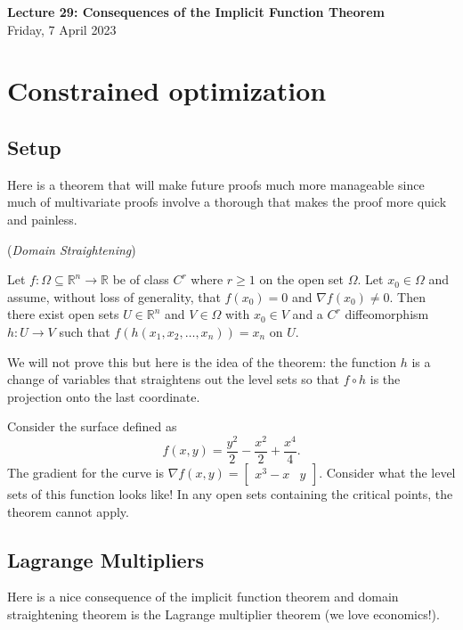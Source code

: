 \documentclass[11pt]{article}
\theoremstyle{definition}
\newcommand{\R}{\mathbb{R}}                      %
\newcommand{\mat}{\begin{bmatrix}}
\newcommand{\trix}{\end{bmatrix}}
\begin{document}
\thispagestyle{empty}

\begin{center}
{\LARGE \bf Lecture 29: Consequences of the Implicit Function Theorem}\\
{\large Friday, 7 April 2023}\\
\end{center}

\section{Constrained optimization}

\subsection{Setup}
Here is a theorem that will make future proofs much more manageable since much of multivariate proofs involve a thorough  that makes the proof more quick and painless. 

\begin{shaded}
\theorem (\textit{Domain Straightening})

Let $f:\Omega\subseteq \R^n\to \R$ be of class $C^r$ where $r\geq 1$ on the open set $\Omega$. Let $x_0\in\Omega$ and assume, without loss of generality, that $f(x_0)=0$ and $\nabla f(x_0)\neq 0$. Then there exist open sets $U\in\R^n$ and $V\in\Omega$ with $x_0\in V$ and a $C^r$ diffeomorphism $h:U\to V$ such that $f(h(x_1,x_2,\dots,x_n))=x_n$ on $U$. 

\end{shaded}

We will not prove this but here is the idea of the theorem: the function $h$ is a change of variables that straightens out the level sets so that $f\circ h$ is the projection onto the last coordinate.

\ex Consider the surface defined as
$$
f(x,y)=\frac{y^2}{2}-\frac{x^2}{2}+\frac{x^4}{4}.
$$
The gradient for the curve is $\nabla f(x,y)=\mat x^3-x & y \trix$. Consider what the level sets of this function looks like! In any open sets containing the critical points, the theorem cannot apply.

\subsection{Lagrange Multipliers}

Here is a nice consequence of the implicit function theorem and domain straightening theorem is the Lagrange multiplier theorem (we love economics!). 
\end{document}
